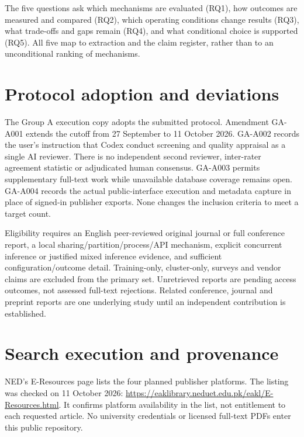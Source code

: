 \documentclass[12pt,a4paper]{article}
\begin{document}
The five questions ask which mechanisms are evaluated (RQ1), how outcomes are measured and compared (RQ2), which operating conditions change results (RQ3), what trade-offs and gaps remain (RQ4), and what conditional choice is supported (RQ5). All five map to extraction and the claim register, rather than to an unconditional ranking of mechanisms.

\section{Protocol adoption and deviations}
The Group A execution copy adopts the submitted protocol. Amendment GA-A001 extends the cutoff from 27 September to 11 October 2026. GA-A002 records the user's instruction that Codex conduct screening and quality appraisal as a single AI reviewer. There is no independent second reviewer, inter-rater agreement statistic or adjudicated human consensus. GA-A003 permits supplementary full-text work while unavailable database coverage remains open. GA-A004 records the actual public-interface execution and metadata capture in place of signed-in publisher exports. None changes the inclusion criteria to meet a target count.

Eligibility requires an English peer-reviewed original journal or full conference report, a local sharing/partition/process/API mechanism, explicit concurrent inference or justified mixed inference evidence, and sufficient configuration/outcome detail. Training-only, cluster-only, surveys and vendor claims are excluded from the primary set. Unretrieved reports are pending access outcomes, not assessed full-text rejections. Related conference, journal and preprint reports are one underlying study until an independent contribution is established.



\section{Search execution and provenance}
NED's E-Resources page lists the four planned publisher platforms. The listing was checked on 11 October 2026: \url{https://eaklibrary.neduet.edu.pk/eakl/E-Resources.html}. It confirms platform availability in the list, not entitlement to each requested article. No university credentials or licensed full-text PDFs enter this public repository.
\end{document}
